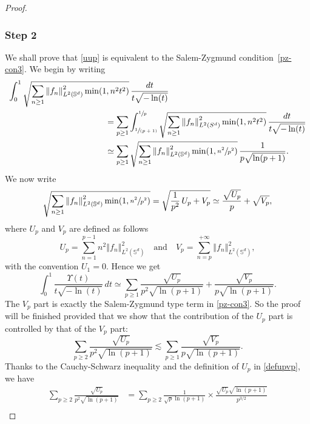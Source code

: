 \documentclass[JEP,XML,SOM,Unicode,NoEqCountersInSection,published]{cedram}
\newcommand{\spfrac}[2]{\sfrac{#1}{(#2)}}
\theoremstyle{theorem}
\theoremstyle{definition}
\newcommand\bbS{\mathbb{S}}
\begin{document}
\begin{proof}
\subsubsection*{Step 2} We shall prove that \eqref{uup} is equivalent to the Salem-Zygmund condition~\eqref{pz-con3}. We begin by writing
\begin{align*}
\int_{0}^1 \sqrt{\sum_{n\geq 1} \left\Vert f_n\right\Vert_{L^2(\bbS^d)}^2 \min(1,n^2 t^2)}&\,\frac{dt}{t\sqrt{-\ln(t)}} \\
&\hspace*{-1cm}=
\sum_{p\geq 1} \int_{\spfrac{1}{p+1}}^{\sfrac{1}{p}}\sqrt{\sum_{n\geq 1} \left\Vert f_n\right\Vert_{L^2(S^d)}^2 \min(1,n^2 t^2)}\,\frac{dt}{t\sqrt{-\ln(t)}} \\
&\hspace*{-1cm}\simeq
\sum_{p\geq 1} \sqrt{\sum_{n\geq 1} \left\Vert f_n\right\Vert_{L^2(\bbS^d)}^2 \min(1,\sfrac{n^2}{p^2})} \,\frac{1}{p\sqrt{\ln(p+1)}}.
\end{align*}
We now write
\begin{equation*}
\sqrt{\sum_{n\geq 1} \left\Vert f_n\right\Vert_{L^2(\bbS^d)}^2 \min(1,\sfrac{n^2}{p^2})}=\sqrt{\frac{1}{p^2}\,U_p+V_p}\simeq \frac{\sqrt{U_p}}{p}+\sqrt{V_p},
\end{equation*}
where $U_p$ and $V_p$ are defined as follows
\begin{equation}\label{defupvp}
U_p=\sum_{n=1}^{p-1} n^2 \left\Vert f_n\right\Vert_{L^2(\bbS^d)}^2 \quad \text{and}\quad V_p=\sum_{n=p}^{+\infty} \left\Vert f_n\right\Vert_{L^2(\bbS^d)}^2, \end{equation}
with the convention $U_1=0$. Hence we get
\begin{equation*}
\int_{0}^1 \frac{\Upsilon(t)}{t\sqrt{-\ln(t)}}\,dt
\simeq \sum_{p\geq 1} \frac{\sqrt{U_p}}{p^2\sqrt{\ln(p+1)}}+\frac{\sqrt{V_p}}{p \sqrt{\ln(p+1)}} .
\end{equation*}
The $V_p$ part is exactly the Salem-Zygmund type term in \eqref{pz-con3}. So the proof will be finished provided that we show that the contribution of the $U_p$ part is controlled by that of the $V_p$ part:
\begin{equation}\label{ddom}
\sum_{p\geq 2} \frac{\sqrt{U_p}}{p^2\sqrt{\ln(p+1)}}\lesssim \sum_{p\geq 1} \frac{\sqrt{V_p}}{p\sqrt{\ln(p+1)}}.
\end{equation}
Thanks to the Cauchy-Schwarz inequality and the definition of $U_p$ in \eqref{defupvp}, we have
\begin{align*}
\sum_{p\geq 2} \frac{\sqrt{U_p}}{p^2\sqrt{\ln(p+1)}} & = \sum_{p\geq 2} \frac{1}{\sqrt{p}\ln(p+1)}\times \frac{\sqrt{U_p} \sqrt{\ln(p+1)}}{p^{3/2}} \\

\end{align*}
\end{proof}
\end{document}
